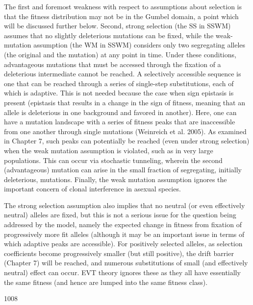 \documentclass{article}
\begin{document}
The first and foremost weakness with respect to assumptions about selection is that the fitness distribution may not be in the Gumbel domain, a point which will be discussed further below. Second, strong selection (the SS in SSWM) assumes that no slightly deleterious mutations can be fixed, while the weak-mutation assumption (the WM in SSWM) considers only two segregating alleles (the original and the mutation) at any point in time. Under these conditions, advantageous mutations that must be accessed through the fixation of a deleterious intermediate cannot be reached. A selectively accessible sequence is one that can be reached through a series of single-step substitutions, each of which is adaptive. This is not needed because the case when sign epistasis is present (epistasis that results in a change in the sign of fitness, meaning that an allele is deleterious in one background and favored in another). Here, one can have a mutation landscape with a series of fitness peaks that are inaccessible from one another through single mutations (Weinreich et al. 2005). As examined in Chapter 7, such peaks can potentially be reached (even under strong selection) when the weak mutation assumption is violated, such as in very large populations. This can occur via stochastic tunneling, wherein the second (advantageous) mutation can arise in the small fraction of segregating, initially deleterious, mutations. Finally, the weak mutation assumption ignores the important concern of clonal interference in asexual species.

The strong selection assumption also implies that no neutral (or even effectively neutral) alleles are fixed, but this is not a serious issue for the question being addressed by the model, namely the expected change in fitness from fixation of progressively more fit alleles (although it may be an important issue in terms of which adaptive peaks are accessible). For positively selected alleles, as selection coefficients become progressively smaller (but still positive), the drift barrier (Chapter 7) will be reached, and numerous substitutions of small (and effectively neutral) effect can occur. EVT theory ignores these as they all have essentially the same fitness (and hence are lumped into the same fitness class).

1008
\end{document}
